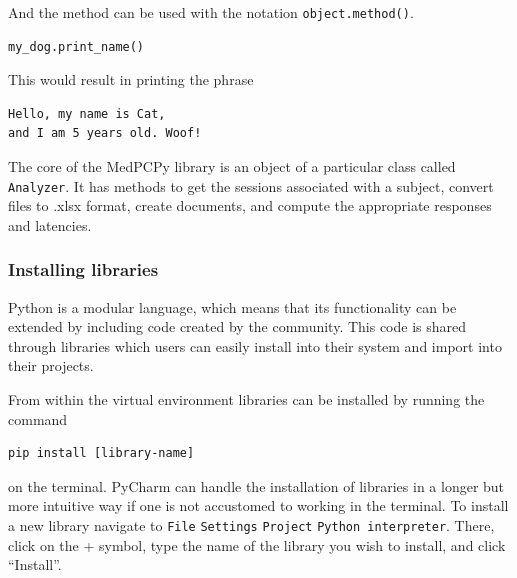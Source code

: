 \documentclass[a4paper,12pt]{article}
\begin{document}
And the method can be used with the notation \verb|object.method()|.

\begin{tcolorbox}[
    enhanced,
    attach boxed title to top left={xshift=6mm,yshift=-3mm},
    colback=lightgreen!20,
    colframe=lightgreen,
    colbacktitle=lightgreen,
    title=Python,
    fonttitle=\bfseries\color{black},
    boxed title style={size=small,colframe=lightgreen,sharp corners},
    sharp corners,
    ]
    \begin{verbatim}
my_dog.print_name()
    \end{verbatim}
\end{tcolorbox}

This would result in printing the phrase

\begin{tcolorbox}[
    enhanced,
    attach boxed title to top left={xshift=6mm,yshift=-3mm},
    colback=lightgray!20,
    colframe=lightgray,
    colbacktitle=lightgray,
    title=Output,
    fonttitle=\bfseries\color{black},
    boxed title style={size=small,colframe=lightgray,sharp corners},
    sharp corners,
    ]
    \begin{verbatim}
Hello, my name is Cat,
and I am 5 years old. Woof!
    \end{verbatim}
\end{tcolorbox}

The core of the MedPCPy library is an object of a particular class called \verb|Analyzer|. It has methods to get the sessions associated with a subject, convert files to .xlsx format, create documents, and compute the appropriate responses and latencies.

\subsubsection{Installing libraries}

Python is a modular language, which means that its functionality can be extended by including code created by the community. This code is shared through libraries which users can easily install into their system and import into their projects.

From within the virtual environment libraries can be installed by running the command

\begin{tcolorbox}[
    enhanced,
    attach boxed title to top left={xshift=6mm,yshift=-3mm},
    colback=lightgreen!20,
    colframe=lightgreen,
    sharp corners,
    ]
    \begin{verbatim}
pip install [library-name]
    \end{verbatim}
\end{tcolorbox}
\noindent on the terminal. PyCharm can handle the installation of libraries in a longer but more intuitive way if one is not accustomed to working in the terminal. To install a new library navigate to \verb|File| \textrightarrow \verb|Settings| \textrightarrow \verb|Project| \textrightarrow \verb|Python interpreter|. There, click on the + symbol, type the name of the library you wish to install, and click ``Install''.
\end{document}
